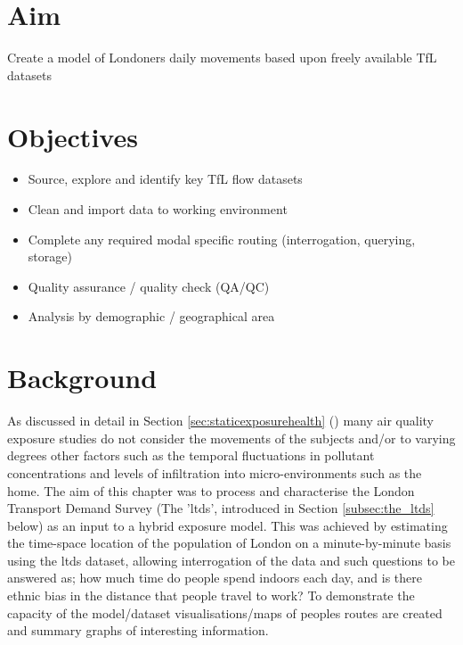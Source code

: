 \section{Aim}
\label{sec:1aim}

Create a model of Londoners daily movements based upon freely available TfL datasets

\section{Objectives}
\label{sec:1objectives}

\begin{itemize}
\item Source, explore and identify key TfL flow datasets
\item Clean and import data to working environment
\item Complete any required modal specific routing (interrogation, querying, storage)
\item Quality assurance / quality check (QA/QC)
\item Analysis by demographic / geographical area
\end{itemize}

\section{Background}
\label{sec:1_background}

As discussed in detail in Section \ref{sec:staticexposurehealth} () many air quality exposure studies do not consider the movements of the subjects and/or to varying degrees other factors such as the temporal fluctuations in pollutant concentrations and levels of infiltration into micro-environments such as the home. The aim of this chapter was to process and characterise the London Transport Demand Survey (The '\gls{ltds}', introduced in Section \ref{subsec:the_ltds} below) as an input to a hybrid exposure model. This was achieved by estimating the time-space location of the population of London on a minute-by-minute basis using the \gls{ltds} dataset, allowing interrogation of the data and such questions to be answered as; how much time do people spend indoors each day, and is there ethnic bias in the distance that people travel to work? To demonstrate the capacity of the model/dataset visualisations/maps of peoples routes are created and summary graphs of interesting information.

